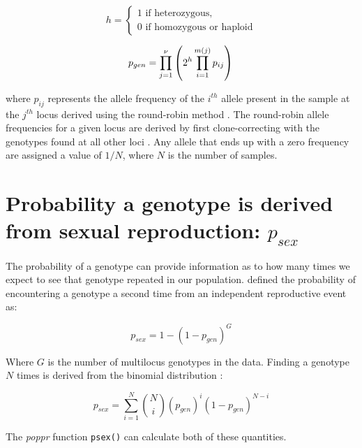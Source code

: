 \documentclass[letterpaper]{article}\usepackage[]{graphicx}\usepackage[]{color}
\newcommand{\poppr}{\textit{poppr}}
\begin{document}
\begin{equation}
h = \begin{cases} 1 \text{ if heterozygous},\\ 0 \text{ if homozygous or haploid}  \end{cases}
\end{equation}

\begin{equation}
p_{gen} = \prod_{j = 1}^\nu\left(2^{h}\prod_{i = 1}^{m(j)} p_{ij}\right) \\
\end{equation}

where $p_{ij}$ represents the allele frequency of the $i^{th}$ allele present in
the sample at the $j^{th}$ locus derived using the round-robin method
\citep{parks1993study, arnaud2007standardizing}. The round-robin allele
frequencies for a given locus are derived by first clone-correcting with the
genotypes found at all other loci \citep{parks1993study,
arnaud2007standardizing}. Any allele that ends up with a zero frequency are
assigned a value of $1/N$, where $N$ is the number of samples.

\section{Probability a genotype is derived from sexual reproduction: $p_{sex}$}

The probability of a genotype can provide information as to how many times we
expect to see that genotype repeated in our population. \citet{parks1993study}
defined the probability of encountering a genotype a second time from an
independent reproductive event as:

\begin{equation}
p_{sex} = 1 - (1 - p_{gen})^G
\end{equation}

Where $G$ is the number of multilocus genotypes in the data. Finding a genotype
$N$ times is derived from the binomial distribution \citep{parks1993study,
arnaud2007standardizing}:

\begin{equation}
p_{sex} = \sum_{i = 1}^N {N \choose i} \left(p_{gen}\right)^i\left(1 - p_{gen}\right)^{N - i}
\end{equation}

The \poppr{} function \texttt{psex()} can calculate both of these quantities. 



\end{document}
